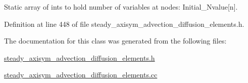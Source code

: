 Static array of ints to hold number of variables at nodes\+: Initial\+\_\+\+Nvalue\mbox{[}n\mbox{]}. 



Definition at line 448 of file steady\+\_\+axisym\+\_\+advection\+\_\+diffusion\+\_\+elements.\+h.



The documentation for this class was generated from the following files\+:\begin{DoxyCompactItemize}
\item 
\hyperlink{steady__axisym__advection__diffusion__elements_8h}{steady\+\_\+axisym\+\_\+advection\+\_\+diffusion\+\_\+elements.\+h}\item 
\hyperlink{steady__axisym__advection__diffusion__elements_8cc}{steady\+\_\+axisym\+\_\+advection\+\_\+diffusion\+\_\+elements.\+cc}\end{DoxyCompactItemize}
